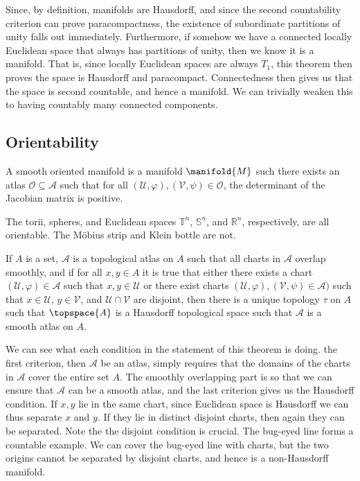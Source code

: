         Since, by definition, manifolds are Hausdorff, and since the second
        countability criterion can prove paracompactness, the existence of
        subordinate partitions of unity falls out immediately. Furthermore,
        if somehow we have a connected locally Euclidean space that always
        has partitions of unity, then we know it is a manifold. That is,
        since locally Euclidean spaces are always $T_{1}$, this theorem then
        proves the space is Hausdorff and paracompact. Connectedness then
        gives us that the space is second countable, and hence a manifold.
        We can trivially weaken this to having countably many connected
        components.
    \subsection{Orientability}
        \begin{definition}
            A smooth oriented manifold is a manifold $\manifold{M}$ such
            there exists an atlas $\mathcal{O}\subseteq\mathcal{A}$ such
            that for all
            $(\mathcal{U},\varphi),(\mathcal{V},\psi)\in\mathcal{O}$, the
            determinant of the Jacobian matrix is positive.
        \end{definition}
        \begin{example}
            The torii, spheres, and Euclidean spaces $\mathbb{T}^{n}$,
            $\mathbb{S}^{n}$, and $\mathbb{R}^{n}$, respectively, are all
            orientable. The M\"{o}bius strip and Klein bottle are not.
        \end{example}
        \begin{theorem}
            If $A$ is a set, $\mathcal{A}$ is a topological atlas on $A$
            such that all charts in $\mathcal{A}$ overlap smoothly, and if
            for all $x,y\in{A}$ it is true that either there exists a chart
            $(\mathcal{U},\varphi)\in\mathcal{A}$ such that
            $x,y\in\mathcal{U}$ or there exist charts
            $(\mathcal{U},\varphi),(\mathcal{V},\psi)\in\mathcal{A})$ such
            that $x\in\mathcal{U}$, $y\in\mathcal{V}$, and
            $\mathcal{U}\cap\mathcal{V}$ are disjoint, then there is a
            unique topology $\tau$ on $A$ such that $\topspace{A}$ is
            a Hausdorff topological space such that $\mathcal{A}$ is a
            smooth atlas on $A$.
        \end{theorem}
        We can see what each condition in the statement of this theorem is
        doing. the first criterion, then $\mathcal{A}$ be an atlas, simply
        requires that the domains of the charts in $\mathcal{A}$ cover the
        entire set $A$. The smoothly overlapping part is so that we can
        ensure that $\mathcal{A}$ can be a smooth atlas, and the last
        criterion gives us the Hausdorff condition. If $x,y$ lie in the same
        chart, since Euclidean space is Hausdorff we can thus separate $x$
        and $y$. If they lie in distinct disjoint charts, then again they
        can be separated. Note the the disjoint condition is crucial. The
        bug-eyed line forms a countable example. We can cover the bug-eyed
        line with charts, but the two origins cannot be separated by
        disjoint charts, and hence is a non-Hausdorff manifold.
